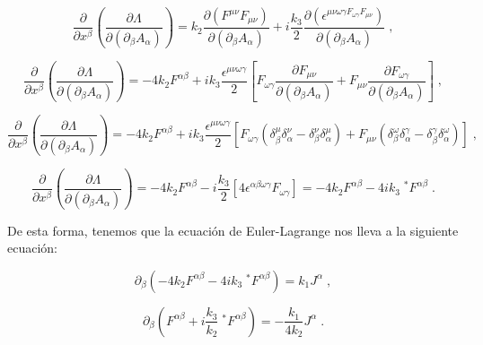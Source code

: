         \begin{equation*}
            \frac{\partial}{\partial x^{\beta}}\left(\frac{\partial \Lambda}{\partial(\partial_{\beta}A_{\alpha})} \right) = k_2\frac{\partial(F^{\mu\nu}F_{\mu\nu})}{\partial(\partial_{\beta}A_{\alpha})} +  i\frac{k_3}{2}\frac{\partial(\epsilon^{\mu\nu\omega\gamma F_{\omega\gamma}F_{\mu\nu}})}{\partial(\partial_{\beta}A_{\alpha})}\;,
        \end{equation*}

        \begin{equation*}
            \frac{\partial}{\partial x^{\beta}}\left(\frac{\partial \Lambda}{\partial(\partial_{\beta}A_{\alpha})} \right) = -4k_2F^{\alpha\beta} + ik_3\frac{\epsilon^{\mu\nu\omega\gamma}}{2}\left[F_{\omega\gamma} \frac{\partial F_{\mu\nu}}{\partial(\partial_{\beta}A_{\alpha})} + F_{\mu\nu} \frac{\partial F_{\omega\gamma}}{\partial(\partial_{\beta}A_{\alpha})} \right]\;,
        \end{equation*}

        \begin{equation*}
            \frac{\partial}{\partial x^{\beta}}\left(\frac{\partial \Lambda}{\partial(\partial_{\beta}A_{\alpha})} \right) = -4k_2F^{\alpha\beta} + ik_3\frac{\epsilon^{\mu\nu\omega\gamma}}{2}\left[F_{\omega\gamma}(\delta^{\mu}_{\beta}\delta^{\nu}_{\alpha} - \delta^{\nu}_{\beta}\delta^{\mu}_{\alpha}) + F_{\mu\nu}(\delta^{\omega}_{\beta}\delta^{\gamma}_{\alpha} - \delta^{\gamma}_{\beta}\delta^{\omega}_{\alpha})\right]\;,
        \end{equation*}

        \begin{equation*}
            \frac{\partial}{\partial x^{\beta}}\left(\frac{\partial \Lambda}{\partial(\partial_{\beta}A_{\alpha})} \right) = -4k_2F^{\alpha\beta} - i\frac{k_3}{2}\left[4\epsilon^{\alpha\beta\omega\gamma}F_{\omega\gamma} \right] = -4k_2F^{\alpha\beta} - 4ik_3\;^*F^{\alpha\beta}\;.
        \end{equation*}

        De esta forma, tenemos que la ecuación de Euler-Lagrange nos lleva a la siguiente ecuación:

        \begin{equation*}
            \partial_{\beta}(-4k_2F^{\alpha\beta} - 4ik_3\;^*F^{\alpha\beta}) = k_1J^{\alpha}\;,
        \end{equation*}

        \begin{equation*}
            \partial_{\beta}(F^{\alpha\beta} + i\frac{k_3}{k_2}\;^*F^{\alpha\beta}) =-\frac{k_1}{4k_2}J^{\alpha}\;.
        \end{equation*}

